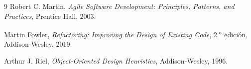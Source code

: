 \documentclass[11pt,a4paper]{article}
\begin{document}

\begin{thebibliography}{9}
  Robert C. Martin,
  \emph{Agile Software Development: Principles, Patterns, and Practices},
  Prentice Hall, 2003.

  Martin Fowler,
  \emph{Refactoring: Improving the Design of Existing Code},
  2.\textsuperscript{a} edici\'on, Addison-Wesley, 2019.

  Arthur J. Riel,
  \emph{Object-Oriented Design Heuristics},
  Addison-Wesley, 1996.
\end{thebibliography}
\end{document}

